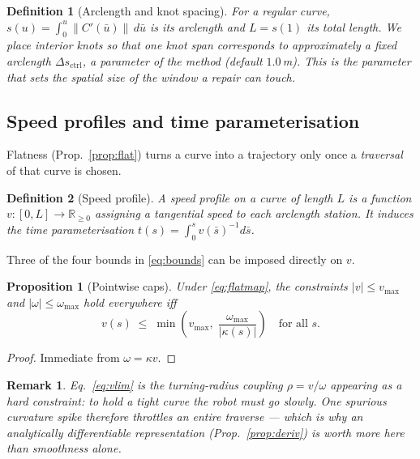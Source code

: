 \documentclass[conference]{IEEEtran}
\newtheorem{definition}{Definition}
\newtheorem{proposition}{Proposition}
\newtheorem{remark}{Remark}
\newcommand{\R}{\mathbb{R}}
\begin{document}
\begin{definition}[Arclength and knot spacing]
\label{def:arclen}
For a regular curve, $s(u) = \int_0^u \lVert C'(\bar u)\rVert\, d\bar u$ is its arclength
and $L = s(1)$ its total length. We place interior knots so that one knot span corresponds
to approximately a fixed arclength $\Delta s_{\text{ctrl}}$, a parameter of the method
(default $1.0$\,m). This is the parameter that sets the spatial size of the window a repair
can touch.
\end{definition}

\subsection{Speed profiles and time parameterisation}
\label{sec:prelim-topp}

Flatness (Prop.~\ref{prop:flat}) turns a curve into a trajectory only once a
\emph{traversal} of that curve is chosen.

\begin{definition}[Speed profile]
A \emph{speed profile} on a curve of length $L$ is a function $v : [0,L] \to \R_{\ge 0}$
assigning a tangential speed to each arclength station. It induces the time
parameterisation $t(s) = \int_0^s v(\bar s)^{-1} d\bar s$.
\end{definition}

Three of the four bounds in \eqref{eq:bounds} can be imposed directly on $v$.

\begin{proposition}[Pointwise caps]
\label{prop:caps}
Under \eqref{eq:flatmap}, the constraints $|v| \le v_{\max}$ and $|\omega|\le\omega_{\max}$
hold everywhere iff
\begin{equation}
  v(s) \;\le\; \min\!\left( v_{\max},\; \frac{\omega_{\max}}{|\kappa(s)|} \right)
  \quad \text{for all } s .
  \label{eq:vlim}
\end{equation}
\end{proposition}

\begin{proof}
Immediate from $\omega = \kappa v$.
\end{proof}

\begin{remark}
Eq.~\eqref{eq:vlim} is the turning-radius coupling $\rho = v/\omega$ appearing as a hard
constraint: to hold a tight curve the robot \emph{must} go slowly. One spurious curvature
spike therefore throttles an entire traverse --- which is why an analytically differentiable
representation (Prop.~\ref{prop:deriv}) is worth more here than smoothness alone.
\end{remark}
\end{document}
